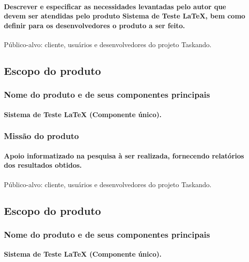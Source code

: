 		\paragraph{Descrever e especificar as necessidades levantadas pelo autor que devem ser atendidas pelo produto Sistema de Teste LaTeX, bem como definir para os desenvolvedores o produto a ser feito.}

\paragraph{}Público-alvo: cliente, usuários e desenvolvedores do projeto Taskando.
	\subsection{Escopo do produto}
		\subsubsection{Nome do produto e de seus componentes principais}
			\paragraph{Sistema de Teste LaTeX (Componente único). }
		\subsubsection{Missão do produto}
			\paragraph{Apoio informatizado na pesquisa à ser realizada, fornecendo relatórios dos resultados obtidos.}
			
\paragraph{}Público-alvo: cliente, usuários e desenvolvedores do projeto Taskando.
	\subsection{Escopo do produto}
		\subsubsection{Nome do produto e de seus componentes principais}
			\paragraph{Sistema de Teste LaTeX (Componente único). }
